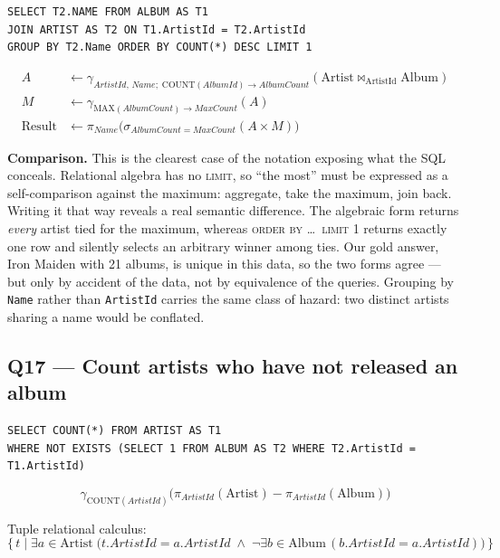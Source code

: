 \documentclass[11pt]{article}
\newcommand{\proj}[1]{\pi_{#1}}
\newcommand{\sel}[1]{\sigma_{#1}}
\newcommand{\agg}[1]{\gamma_{#1}}
\newcommand{\jn}{\bowtie}
\begin{document}
\begin{lstlisting}
SELECT T2.NAME FROM ALBUM AS T1
JOIN ARTIST AS T2 ON T1.ArtistId = T2.ArtistId
GROUP BY T2.Name ORDER BY COUNT(*) DESC LIMIT 1
\end{lstlisting}

\begin{align*}
A &\leftarrow \agg{ArtistId,\,Name;\;\mathrm{COUNT}(AlbumId)\rightarrow AlbumCount}
     (\text{Artist} \jn_{\text{ArtistId}} \text{Album}) \\
M &\leftarrow \agg{\mathrm{MAX}(AlbumCount)\rightarrow MaxCount}(A) \\
\text{Result} &\leftarrow \proj{Name}\bigl(\sel{AlbumCount=MaxCount}(A \times M)\bigr)
\end{align*}

\textbf{Comparison.} This is the clearest case of the notation exposing what the SQL conceals.
Relational algebra has no \textsc{limit}, so ``the most'' must be expressed as a self-comparison
against the maximum: aggregate, take the maximum, join back. Writing it that way reveals a real
semantic difference. The algebraic form returns \emph{every} artist tied for the maximum, whereas
\textsc{order by \ldots\ limit 1} returns exactly one row and silently selects an arbitrary
winner among ties. Our gold answer, Iron Maiden with 21 albums, is unique in this data, so the
two forms agree --- but only by accident of the data, not by equivalence of the queries.
Grouping by \texttt{Name} rather than \texttt{ArtistId} carries the same class of hazard: two
distinct artists sharing a name would be conflated.

\subsection*{Q17 --- Count artists who have not released an album}

\begin{lstlisting}
SELECT COUNT(*) FROM ARTIST AS T1
WHERE NOT EXISTS (SELECT 1 FROM ALBUM AS T2 WHERE T2.ArtistId = T1.ArtistId)
\end{lstlisting}

\[
\agg{\mathrm{COUNT}(ArtistId)}\bigl(
  \proj{ArtistId}(\text{Artist}) - \proj{ArtistId}(\text{Album})\bigr)
\]

Tuple relational calculus:
\[
\{\, t \mid \exists a \in \text{Artist}\;\bigl(t.ArtistId = a.ArtistId \;\wedge\;
  \neg\exists b \in \text{Album}\,(b.ArtistId = a.ArtistId)\bigr) \,\}
\]
\end{document}
